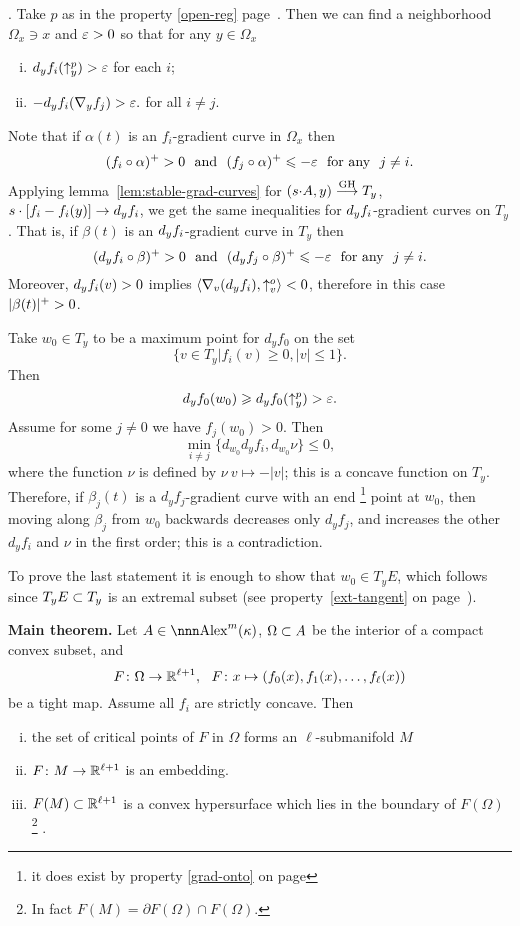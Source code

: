 \documentclass{article}
\begin{document}
\Proof. Take $p$ as in the property \ref{open-reg} page~\pageref{open-reg}.
Then we can find a neighborhood $\Omega_x\ni x$ and $\varepsilon>0$ so that for any
$y\in \Omega_x$
\begin{enumerate}[(i)]
\item $d_y f_i(\uparrow_y^p)>\varepsilon$ for each $i$;
\item $-d_y f_i(\nabla_y f_j)>\varepsilon.$ for all $i\not=j$.
\end{enumerate}

Note that if $\alpha(t)$ is an $f_i$-gradient curve in $\Omega_x$ then 
$$(f_i\circ\alpha)^+>0
\ \ \text{and}\ \ 
(f_j\circ\alpha)^+\le -\eps
\ \ \text{for any}\ \ 
j\not=i.$$
Applying  lemma~\ref{lem:stable-grad-curves} for
$(\lam{\cdot} A,y)\GHto T_y$, $s\cdot[f_i-f_i(y)]\to d_y f_i$, we get the same inequalities for 
$d_y f_i$-gradient curves on $T_y$.
That is, if $\beta(t)$ is an 
$d_y f_i$-gradient curve in $T_y$ then 
$$(\d_y f_i\circ\beta)^+>0
\ \ \text{and}\ \ 
(\d_y f_j\circ\beta)^+\le-\eps
\ \
\text{for any}\ \ 
j\not=i.$$
Moreover, $d_y f_i(v)>0$
implies $\langle\nabla_v(d_y f_i),\uparrow_{v}^o\rangle<0$, 
therefore in this case $|\beta(t)|^+\z>0$.

Take $w_0\in T_y$ to be a maximum point for $d_y f_0$ on the set 
$$\{v\in T_y|f_i(v)\ge0, |v|\le 1\}.$$
Then
$$d_y f_0(w_0)\geqslant d_y f_0(\uparrow_y^p)>\varepsilon.$$
Assume for some $j\not=0$ we have $f_j(w_0)>0$.
Then 
$$\min_{i\not=j} \{d_{w_0}d_y f_i,d_{w_0}\nu\}\le 0,$$
where the function $\nu$ is defined by $\nu\:v\mapsto -|v|$; 
this is a concave function
on $T_y$.
Therefore, if $\beta_j(t)$ is a $d_y f_j$-gradient curve with an end%
\footnote{it does exist by property \ref{grad-onto} on page \pageref{grad-onto}} 
point at
$w_0$, then moving along $\beta_j$ from $w_0$ backwards decreases only
$d_y f_j$,  and increases the other $d_y f_i$ and $\nu$ in the first order; this is a
contradiction.

To prove the last statement it is enough to show that $w_0\in T_y E$, which follows since $T_y E\subset T_y$ is an extremal subset (see property~\ref{ext-tangent} on page~\pageref{ext-tangent}).  
\qeds

\begin{thm}{\bf Main theorem.}\label{thm:tight-map}
Let $A\in\Alex^m(\kappa)$, $\Omega\subset A$ be the interior of a compact convex subset,
and 
$$F\colon\Omega\to \mathbb{R}^{\ell+1},\ \ F\colon x\mapsto(f_0(x),f_1(x),\dots,f_\ell(x))$$ 
be a tight map. 
Assume all $f_i$ are strictly concave.
Then 
\begin{enumerate}[(i)]
\item the set of critical points of $F$ in $\Omega$ forms an $\ell$-submanifold $M$ 
\item  $F\colon M\to\mathbb{R}^{\ell+1}$ is an embedding. 
\item  $F(M)\subset \mathbb{R}^{\ell+1}$ is a convex hypersurface which lies in the boundary of
$F(\Omega)$%
\footnote{In fact $F(M)=\partial F(\Omega)\cap F(\Omega)$.}%
.
\end{enumerate}
\end{thm}
\end{document}
